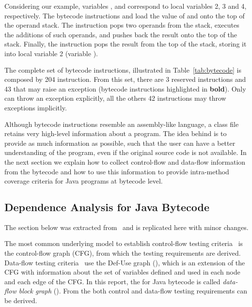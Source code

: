Considering our example, variables ,  and 
correspond to local variables 2, 3 and 4, respectively. The
bytecode instructions  and  load the
value of  and  onto the top of the operand stack.
The instruction  pops two operands from the stack,
executes the additions of such operands, and pushes back the
result onto the top of the stack. Finally, the instruction
 pops the result from the top of the stack, storing
it into local variable 2 (variable ).

The complete set of bytecode instructions, illustrated in
Table~\ref{tab:bytecode} is composed by 204 instruction. From this
set, there are 3 reserved instructions and 43 that may raise an
exception (bytecode instructions highlighted in \textbf{bold}).
Only  can throw an exception explicitly, all the
others 42 instructions may throw exceptions implicitly.

Although bytecode instructions resemble an assembly-like language,
a class file retains very high-level information about a program.
The idea behind \toolname is to provide as much information as
possible, such that the user can have a better understanding of
the program, even if the original source code is not available. In
the next section we explain how to collect control-flow and
data-flow information from the bytecode and how to use this
information to provide intra-method coverage criteria for Java
programs at bytecode level.

\subsection{Dependence Analysis for Java Bytecode}\label{sec:dependence}

The section below was extracted from~\cite{Vincenzi03JBSD} and is
replicated here with minor changes.

The most common underlying model to establish control-flow testing
criteria~\cite{McCabe76CMEA,Roper94STES} is the control-flow graph
(CFG), from which the testing requirements are derived. Data-flow
testing
criteria~\cite{Herman76DFAA,Rapps85SSTD,Maldonado91CPUC-EN} use
the Def-Use graph (\DUG), which is an extension of the CFG with
information about the set of variables defined and used in each
node and each edge of the CFG. In this report, the \DUG for Java
bytecode is called \emph{data-flow block graph} (\BG). From the
\BG both control and data-flow testing requirements can be
derived.

